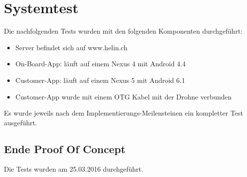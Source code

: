 \newpage
\chapter{Systemtest}

Die nachfolgenden Tests wurden mit den folgenden Komponenten durchgeführt:

\begin{itemize}
	\item Server befindet sich auf www.helin.ch
	\item On-Board-App: läuft auf einem Nexus 4 mit Android 4.4
	\item Customer-App: läuft auf einem Nexus 5 mit Android 6.1
	\item Customer-App wurde mit einem OTG Kabel mit der Drohne verbunden
\end{itemize}

Es wurde jeweils nach dem Implementierungs-Meilensteinen ein kompletter Test ausgeführt.

\section{Ende Proof Of Concept}

Die Tests wurden am 25.03.2016 durchgeführt.

